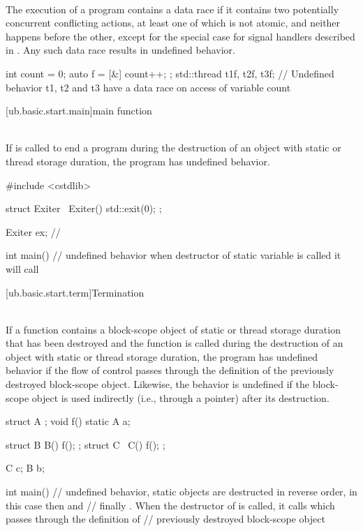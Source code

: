 \pnum
{} \\
The execution of a program contains a data race if it contains two potentially concurrent conflicting actions,
at least one of which is not atomic, and neither happens before the other, except for the special case for
signal handlers described in . Any such data race results in undefined behavior.

\pnum
\begin{example}
\begin{codeblock}
int count = 0;
auto f = [&] { count++; };
std::thread t1{f}, t2{f}, t3{f};
// Undefined behavior t1, t2 and t3 have a data race on access of variable count
\end{codeblock}
\end{example}


[ub.basic.start.main]{main function}

\pnum
{} \\
If  is called to
end a program during the destruction of an object with static or thread storage duration, the program has
undefined behavior.

\pnum
\begin{example}
\begin{codeblock}
#include <cstdlib>

struct Exiter {
  ~Exiter() { std::exit(0); }
};

Exiter ex;  //

int main() {}
// undefined behavior when destructor of static variable  is called it will call 
\end{codeblock}
\end{example}


[ub.basic.start.term]{Termination}

\pnum
{} \\
If a function contains a block-scope object of static or thread storage duration that has been destroyed and the
function is called during the destruction of an object with static or thread storage duration, the program has
undefined behavior if the flow of control passes through the definition of the previously destroyed block-scope
object. Likewise, the behavior is undefined if the block-scope object is used indirectly (i.e., through a pointer)
after its destruction.

\pnum
\begin{example}
\begin{codeblock}
struct A {};
void f() {
  static A a;
}

struct B {
  B() { f(); }
};
struct C {
  ~C() { f(); }
};

C c;
B b;

int main() {}
// undefined behavior, static objects are destructed in reverse order, in this case  then  and
// finally . When the destructor of  is called, it calls  which passes through the definition of
// previously destroyed block-scope object
\end{codeblock}
\end{example}


